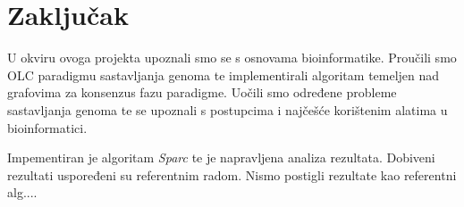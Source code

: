 \chapter{Zaključak}

U okviru ovoga projekta upoznali smo se s osnovama bioinformatike.
Proučili smo OLC paradigmu sastavljanja genoma te implementirali algoritam temeljen nad grafovima za konsenzus fazu paradigme.
Uočili smo određene probleme sastavljanja genoma te se upoznali s postupcima i najčešće korištenim alatima u bioinformatici.

Impementiran je algoritam \emph{Sparc} te je napravljena analiza rezultata.
Dobiveni rezultati uspoređeni su referentnim radom.
Nismo postigli rezultate kao referentni alg....

